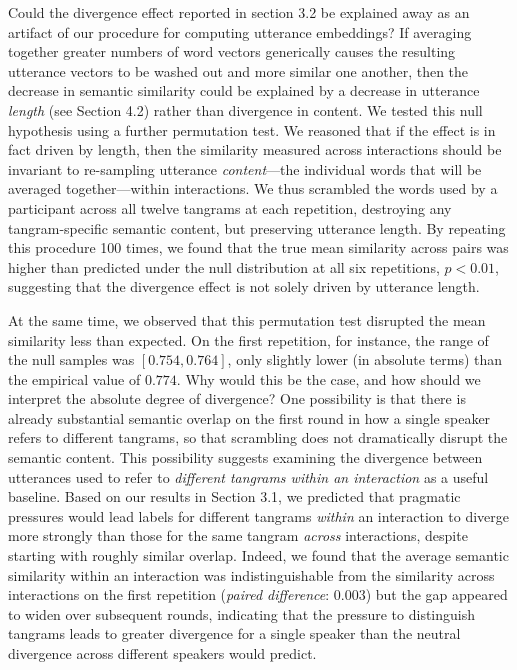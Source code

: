\documentclass[alpha-refs]{wiley-article}
\begin{document}
Could the divergence effect reported in section 3.2 be explained away as an artifact of our procedure for computing utterance embeddings?
If averaging together greater numbers of word vectors generically causes the resulting utterance vectors to be washed out and more similar one another, then the decrease in semantic similarity could be explained by a decrease in utterance \emph{length} (see Section 4.2) rather than divergence in content.
We tested this null hypothesis using a further  permutation test.
We reasoned that if the effect is in fact driven by length, then the similarity measured across interactions should be invariant to re-sampling utterance \emph{content}---the individual words that will be averaged together---within interactions.
We thus scrambled the words used by a participant across all twelve tangrams at each repetition, destroying any tangram-specific semantic content, but preserving utterance length.
By repeating this procedure 100 times, we found that the true mean similarity across pairs was higher than predicted under the null distribution at all six repetitions, $p < 0.01$, suggesting that the divergence effect is not solely driven by utterance length.

At the same time, we observed that this permutation test disrupted the mean similarity less than expected.
On the first repetition, for instance, the range of the null samples was $[0.754, 0.764]$, only slightly lower (in absolute terms) than the empirical value of $0.774$.
Why would this be the case, and how should we interpret the absolute degree of divergence?
One possibility is that there is already substantial semantic overlap on the first round in how a single speaker refers to different tangrams, so that scrambling does not dramatically disrupt the semantic content.
This possibility suggests examining the divergence between utterances used to refer to \emph{different tangrams within an interaction} as a useful baseline.
Based on our results in Section 3.1, we predicted that pragmatic pressures would lead labels for different tangrams \emph{within} an interaction to diverge more strongly than those for the same tangram \emph{across} interactions, despite starting with roughly similar overlap.
Indeed, we found that the average semantic similarity within an interaction was indistinguishable from the similarity across interactions on the first repetition (\emph{paired difference}: $0.003$) but the gap appeared to widen over subsequent rounds, indicating that the pressure to distinguish tangrams leads to greater divergence for a single speaker than the neutral divergence across different speakers would predict.
\end{document}
